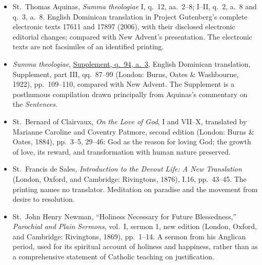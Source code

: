 \begin{itemize}[leftmargin=1.25em,itemsep=0pt,parsep=0pt]
\item St.~Thomas Aquinas, \emph{Summa theologiae} I, q.~12, aa.~2--8; I--II, q.~2, a.~8 and q.~3, a.~8. English Dominican translation in Project Gutenberg's complete electronic texts 17611 and 17897 (2006), with their disclosed electronic editorial changes; compared with New Advent's presentation. The electronic texts are not facsimiles of an identified printing.
\item \emph{Summa theologiae}, \href{https://www.newadvent.org/summa/5094.htm\#article3}{Supplement, q.~94, a.~3}, English Dominican translation, Supplement, part III, qq.~87--99 (London: Burns, Oates \& Washbourne, 1922), pp.~109--110, compared with New Advent. The Supplement is a posthumous compilation drawn principally from Aquinas's commentary on the \emph{Sentences}.
\item St.~Bernard of Clairvaux, \emph{On the Love of God}, I and VII--X, translated by Marianne Caroline and Coventry Patmore, second edition (London: Burns \& Oates, 1884), pp.~3--5, 29--46: God as the reason for loving God; the growth of love, its reward, and transformation with human nature preserved.
\item St.~Francis de Sales, \emph{Introduction to the Devout Life: A New Translation} (London, Oxford, and Cambridge: Rivingtons, 1876), I.16, pp.~43--45. The printing names no translator. Meditation on paradise and the movement from desire to resolution.
\item St.~John Henry Newman, ``Holiness Necessary for Future Blessedness,'' \emph{Parochial and Plain Sermons}, vol.~I, sermon 1, new edition (London, Oxford, and Cambridge: Rivingtons, 1869), pp.~1--14. A sermon from his Anglican period, used for its spiritual account of holiness and happiness, rather than as a comprehensive statement of Catholic teaching on justification.
\end{itemize}\endgroup
